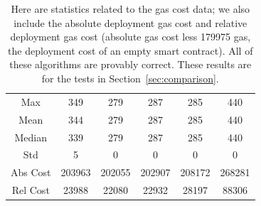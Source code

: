 \begin{table}[p]
\centering
\begin{tabular}{|c|
    |S[table-format=6.0]|S[table-format=6.0]
    |S[table-format=6.0]|S[table-format=6.0]
    |S[table-format=6.0]|}
\hline
& \BitLength{} &  \Linear{} &
    \HyperFour{} & \LookupFour{} & \LookupEight{} \\
\hline
Max      &    349 &     279 &    287 &    285 &    440 \\
Mean     &    344 &     279 &    287 &    285 &    440 \\
Median   &    339 &     279 &    287 &    285 &    440 \\
Std      &      5 &       0 &      0 &      0 &      0 \\
\hline
Abs Cost & 203963 &                       202055 & 202907 & 208172 & 268281 \\
Rel Cost &  23988 &                        22080 &  22932 &  28197 &  88306 \\
\hline
\end{tabular}
\caption[Gas Costs Statistics 3]{Here are statistics
    related to the gas cost data;
    we also include the absolute deployment gas cost and
    relative deployment gas cost
    (absolute gas cost less \num{179975} gas,
    the deployment cost of an empty smart contract).
    All of these algorithms are provably correct.
    These results are for the tests in Section~\ref{sec:comparison}.
    }
\label{table:gas_costs_3}
\end{table}
